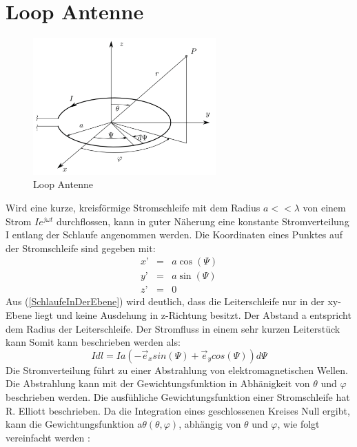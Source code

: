
\section{Loop Antenne}\label{sec:LoopAntenneTheorie}
\begin{figure}[h]
	\centering
	\includegraphics[width=7cm]{content/bilder/Loop_EMANT_S45.pdf}%
	\caption{Loop Antenne}
	\label{LoopAntenne}
\end{figure}
Wird eine kurze, kreisförmige Stromschleife mit dem Radius $a<<\lambda$ von einem Strom $Ie^{j\omega t}$ durchflossen, kann in guter Näherung eine konstante Stromverteilung I entlang der Schlaufe angenommen werden. Die Koordinaten eines Punktes auf der Stromschleife sind gegeben mit:
\begin{eqnarray}
x’ &=& a \cos(\Psi)\\
y’ &=& a \sin(\Psi)\\
z’ &=& 0\label{SchlaufeInDerEbene}
\end{eqnarray}
Aus  (\ref{SchlaufeInDerEbene}) wird deutlich, dass die Leiterschleife nur in der xy-Ebene liegt und keine Ausdehung in z-Richtung besitzt. Der Abstand a entspricht dem Radius der Leiterschleife. Der Stromfluss in einem sehr kurzen Leiterstück kann Somit kann beschrieben werden als:
\begin{equation}
I dl= Ia(- \vec e_{x}sin(\Psi)+\vec e_{y}cos(\Psi))d\Psi
\end{equation}
Die Stromverteilung führt zu einer Abstrahlung von elektromagnetischen Wellen. Die Abstrahlung kann mit der Gewichtungsfunktion in Abhänigkeit von $\theta$ und $\varphi$ beschrieben werden. Die ausfühliche Gewichtungsfunktion einer Stromschleife hat R. Elliott \cite{elliott1981antenna} beschrieben. Da die Integration eines geschlossenen Kreises Null ergibt, kann die Gewichtungsfunktion a$\theta(\theta, \varphi)$, abhängig von $\theta$ und $\varphi$, wie folgt vereinfacht werden \cite{Emant}:
